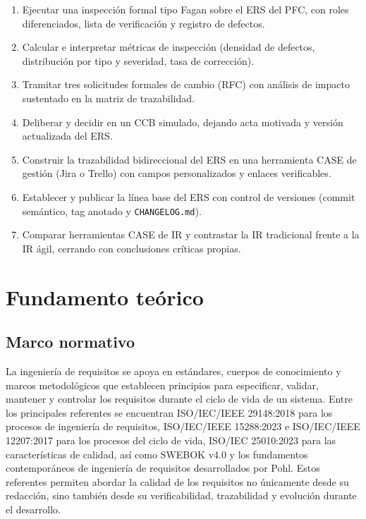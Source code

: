 \documentclass[journal,onecolumn]{IEEEtran}
\begin{document}
	\begin{enumerate}
		\item Ejecutar una inspección formal tipo Fagan sobre el ERS del PFC, con roles
		diferenciados, lista de verificación y registro de defectos.
		\item Calcular e interpretar métricas de inspección (densidad de defectos,
		distribución por tipo y severidad, tasa de corrección).
		\item Tramitar tres solicitudes formales de cambio (RFC) con análisis de impacto
		sustentado en la matriz de trazabilidad.
		\item Deliberar y decidir en un CCB simulado, dejando acta motivada y versión
		actualizada del ERS.
		\item Construir la trazabilidad bidireccional del ERS en una herramienta CASE de
		gestión (Jira o Trello) con campos personalizados y enlaces verificables.
		\item Establecer y publicar la línea base del ERS con control de versiones
		(commit semántico, tag anotado y \texttt{CHANGELOG.md}).
		\item Comparar herramientas CASE de IR y contrastar la IR tradicional frente a la
		IR ágil, cerrando con conclusiones críticas propias.
	\end{enumerate}
	\newpage
	\section{Fundamento teórico}
	
	\subsection{Marco normativo}
	
	La ingeniería de requisitos se apoya en estándares, cuerpos de conocimiento y marcos metodológicos que establecen principios para especificar, validar, mantener y controlar los requisitos durante el ciclo de vida de un sistema. Entre los principales referentes se encuentran ISO/IEC/IEEE 29148:2018 para los procesos de ingeniería de requisitos, ISO/IEC/IEEE 15288:2023 e ISO/IEC/IEEE 12207:2017 para los procesos del ciclo de vida, ISO/IEC 25010:2023 para las características de calidad, así como SWEBOK v4.0 y los fundamentos contemporáneos de ingeniería de requisitos desarrollados por Pohl. Estos referentes permiten abordar la calidad de los requisitos no únicamente desde su redacción, sino también desde su verificabilidad, trazabilidad y evolución durante el desarrollo.
	
\end{document}
